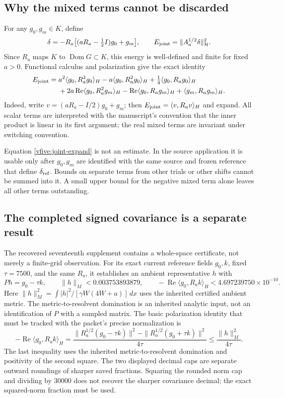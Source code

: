 \documentclass[11pt,a4paper]{article}
\numberwithin{equation}{section}
\theoremstyle{definition}\newtheorem{definition}[theorem]{Definition}
\theoremstyle{remark}\newtheorem{remark}[theorem]{Remark}
\newcommand{\rhip}[2]{\langle#1,#2\rangle_H}
\newcommand{\Hh}{\mathcal H}\newcommand{\Hw}{\mathcal H}
\newcommand{\dom}{\operatorname{Dom}}\newcommand{\Var}{\operatorname{Var}}
\begin{document}
\subsection{Why the mixed terms cannot be discarded}
For any $g_0,g_m\in K$, define
\[
 \delta=-R_a\bigl[(aR_a-\tfrac12 I)g_0+g_m\bigr],
 \qquad E_{\rm joint}=\|A_a^{1/2}\delta\|_{\Hh}^2.
\]
Since $R_a$ maps $K$ to $\dom G\subset K$, this energy is well-defined and finite for fixed $a>0$. Functional calculus and polarization give the exact identity
\begin{align}\label{vfive:joint-expand}
 E_{\rm joint}={}&a^2\rhip{g_0}{R_a^3g_0}-a\rhip{g_0}{R_a^2g_0}
 +\tfrac14\rhip{g_0}{R_ag_0}\\
 &+2a\operatorname{Re}\rhip{g_0}{R_a^2g_m}
 -\operatorname{Re}\rhip{g_0}{R_ag_m}
 +\rhip{g_m}{R_ag_m}.\nonumber
\end{align}
Indeed, write $v=(aR_a-I/2)g_0+g_m$; then $E_{\rm joint}=\rhip{v}{R_av}$ and expand. All scalar terms are interpreted with the manuscript's convention that the inner product is linear in its first argument; the real mixed terms are invariant under switching convention.

Equation \eqref{vfive:joint-expand} is not an estimate. In the source application it is usable only after $g_0,g_m$ are identified with the same source and frozen reference that define $\delta_{\rm ref}$. Bounds on separate terms from other trials or other shifts cannot be summed into it. A small upper bound for the negative mixed term alone leaves all other terms outstanding.

\subsection{The completed signed covariance is a separate result}
The recovered seventeenth supplement contains a whole-space certificate, not merely a finite-grid observation. For its exact current reference fields $g_0,k$, fixed $\tau=7500$, and the same $R_a$, it establishes an ambient representative $h$ with
\[
 Ph=g_0-\tau k,\qquad
 \|h\|_M<0.003753893879,
 \qquad -\operatorname{Re}\rhip{g_0}{R_ak}<4.697239750\times10^{-10}.
\]
Here $\|h\|_M^2=\int |h|^2/[\gamma W(4W+a)]\,dx$ uses the inherited certified ambient metric. The metric-to-resolvent domination is an inherited analytic input, not an identification of $P$ with a sampled matrix. The basic polarization identity that must be tracked with the packet's precise normalization is
\[
 -\operatorname{Re}\rhip{g_0}{R_ak}
 =\frac{\|R_a^{1/2}(g_0-\tau k)\|^2
       -\|R_a^{1/2}(g_0+\tau k)\|^2}{4\tau}
 \leq\frac{\|h\|_M^2}{4\tau}.
\]
The last inequality uses the inherited metric-to-resolvent domination and positivity of the second square. The two displayed decimal caps are separate outward roundings of sharper saved fractions. Squaring the rounded norm cap and dividing by $30000$ does not recover the sharper covariance decimal; the exact squared-norm fraction must be used.
\end{document}
